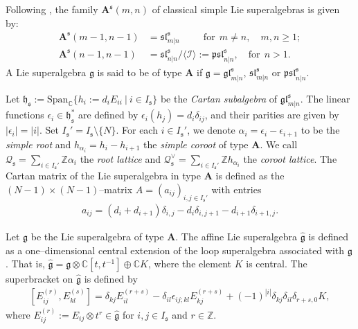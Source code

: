 \documentclass[a4paper,12pt]{article}
\newtheorem{rema}[theo]{Remark}
\numberwithin{equation}{section}
\begin{document}
Following \cite{K77}, the family $\boldsymbol{A}^{\mathfrak{s}}(m,n)$ of classical simple Lie superalgebras is given by:
\begin{align*}
\boldsymbol{A}^{\mathfrak{s}}(m-1,n-1)&=\mathfrak{sl}_{m|n}^{\mathfrak{s}}\qquad~~\text{for}~~m\neq n,\quad m,n\geqslant 1;\\
\boldsymbol{A}^{\mathfrak{s}}(n-1,n-1)&=\mathfrak{sl}_{n|n}^{\mathfrak{s}}/\langle \mathcal{I}\rangle := \mathfrak{psl}^{\mathfrak{s}}_{n|n},\quad \text{for} ~~n>1.
\end{align*}
A Lie superalgebra $\mathfrak{g}$ is said to be of type $\boldsymbol{A}$ if $\mathfrak{g}=\mathfrak{gl}_{m|n}^{\mathfrak{s}}$, $\mathfrak{sl}_{m|n}^{\mathfrak{s}}$ or $\mathfrak{psl}^{\mathfrak{s}}_{n|n}$.


Let $\mathfrak{h}_{\mathfrak{s}}:=\text{Span}_{\mathbb{C}}\{h_{i}:=d_{i}E_{ii}\ |\ i\in I_{\mathfrak{s}}\}$ be the \textit{Cartan subalgebra} of $\mathfrak{gl}_{m|n}^{\mathfrak{s}}$. The linear functions $\epsilon_{i}\in\mathfrak{h}_{\mathfrak{s}}^{\ast}$ are defined by $\epsilon_{i}(h_{j})=d_{i}\delta_{ij}$, and their parities are given by $|\epsilon_{i}|=|i|$. Set $I_{\mathfrak{s}}'=I_{\mathfrak{s}}\setminus\{N\}$. For each $i\in I_{\mathfrak{s}}'$, we denote
$\alpha_{i}=\epsilon_{i}-\epsilon_{i+1}$  to be the \textit{simple root} and $h_{\alpha_{i}}=h_{i}-h_{i+1}$ the \textit{simple coroot} of type $\boldsymbol{A}$. We call $\mathcal{Q}_{\mathfrak{s}}=\sum_{i\in I_{
\mathfrak{s}}'}\mathbb{Z}\alpha_{i}$  the \textit{root lattice} and $\mathcal{Q}_{\mathfrak{s}}^{\vee}=\sum_{i\in I_{\mathfrak{s}}'}\mathbb{Z}h_{\alpha_{i}}$ the \textit{coroot lattice}. The Cartan matrix of the Lie superalgebra in type $\boldsymbol{A}$ is defined as the $(N-1)\times (N-1)$--matrix $A=\left(a_{i j}\right)_{i,j\in I_{\mathfrak{s}}'}$ with entries
\begin{gather*}
    a_{i j}=\left(d_{i}+d_{i+1}\right) \delta_{i, j}-d_{i}\delta_{i, j+1}-d_{i+1}\delta_{i+1, j}.
\end{gather*}



Let $\mathfrak{g}$ be the Lie superalgebra of type $\boldsymbol{A}$. The affine Lie superalgebra $\widehat{\mathfrak{g}}$ is defined as a one--dimensional central extension of the loop superalgebra associated with $\mathfrak{g}$. That is, $\widehat{\mathfrak{g}}=\mathfrak{g}
\otimes \mathbb{C}[t,t^{-1}]\oplus \mathbb{C}K$, where the element $K$ is central. 
The superbracket on $\widehat{\mathfrak{g}}$ is defined by
\begin{align}\label{affine}
\left[E_{ij}^{(r)},E_{kl}^{(s)}\right]=\delta_{kj}E_{il}^{(r+s)}-\delta_{il}\epsilon_{ij;kl}
E_{kj}^{(r+s)}+(-1)^{|i|}\delta_{kj}\delta_{il}\delta_{r+s,0}K,
\end{align}
where $E_{ij}^{(r)}:=E_{ij}\otimes t^r\in\widehat{\mathfrak{g}}$ for $i,j\in I_{\mathfrak{s}}$ and $r\in \mathbb{Z}$.
\end{document}
